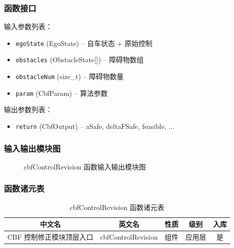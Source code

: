 \documentclass[a4paper,10pt]{article}
\begin{document}
\subsubsection{函数接口}
\par 输入参数列表：
\begin{itemize}
  \item \texttt{egoState} (EgoState) -- 自车状态 + 原始控制
  \item \texttt{obstacles} (ObstacleState[]) -- 障碍物数组
  \item \texttt{obstacleNum} (size\_t) -- 障碍物数量
  \item \texttt{param} (CbfParam) -- 算法参数
\end{itemize}
\par 输出参数列表：
\begin{itemize}
  \item \texttt{return} (CbfOutput) -- {aSafe, deltaFSafe, feasible, ...}
\end{itemize}
\subsubsection{输入输出模块图}
\begin{figure}[h]
    \centering
    \caption{cbfControlRevision 函数输入输出模块图}
    \label{fig:io_cbfControlRevision}
\end{figure}
\subsubsection{函数诸元表}
\begin{table}[h]
    \centering
    \caption{cbfControlRevision 函数诸元表}
    \label{tab:meta_cbfControlRevision}
    \begin{tabular}{|c|c|c|c|c|}
        \hline
        中文名 & 英文名 & 性质 & 级别 & 入库 \\ \hline
        CBF 控制修正模块顶层入口 & cbfControlRevision & 组件 & 应用层 & 是 \\ \hline
    \end{tabular}
\end{table}
\end{document}
